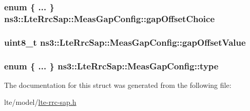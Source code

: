 \subsubsection[{\texorpdfstring{gap\+Offset\+Choice}{gapOffsetChoice}}]{\setlength{\rightskip}{0pt plus 5cm}enum \{ ... \}   ns3\+::\+Lte\+Rrc\+Sap\+::\+Meas\+Gap\+Config\+::gap\+Offset\+Choice}\hypertarget{structns3_1_1LteRrcSap_1_1MeasGapConfig_a8881a3dab866d938ad0913cb3fbb3913}{}\label{structns3_1_1LteRrcSap_1_1MeasGapConfig_a8881a3dab866d938ad0913cb3fbb3913}
\subsubsection[{\texorpdfstring{gap\+Offset\+Value}{gapOffsetValue}}]{\setlength{\rightskip}{0pt plus 5cm}uint8\+\_\+t ns3\+::\+Lte\+Rrc\+Sap\+::\+Meas\+Gap\+Config\+::gap\+Offset\+Value}\hypertarget{structns3_1_1LteRrcSap_1_1MeasGapConfig_abdda474a7affed45137bb7b407520c15}{}\label{structns3_1_1LteRrcSap_1_1MeasGapConfig_abdda474a7affed45137bb7b407520c15}
\subsubsection[{\texorpdfstring{type}{type}}]{\setlength{\rightskip}{0pt plus 5cm}enum \{ ... \}   ns3\+::\+Lte\+Rrc\+Sap\+::\+Meas\+Gap\+Config\+::type}\hypertarget{structns3_1_1LteRrcSap_1_1MeasGapConfig_af7e706f0e8f0fa3c80410687a5c2cb67}{}\label{structns3_1_1LteRrcSap_1_1MeasGapConfig_af7e706f0e8f0fa3c80410687a5c2cb67}


The documentation for this struct was generated from the following file\+:\begin{DoxyCompactItemize}
\item 
lte/model/\hyperlink{lte-rrc-sap_8h}{lte-\/rrc-\/sap.\+h}\end{DoxyCompactItemize}
